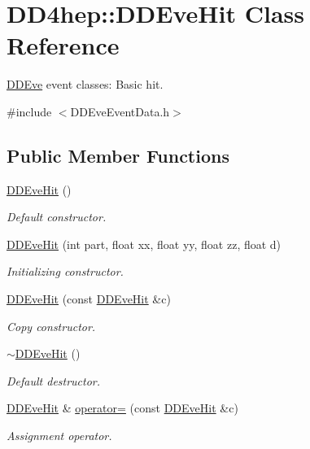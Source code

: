\hypertarget{class_d_d4hep_1_1_d_d_eve_hit}{}\section{D\+D4hep\+:\+:D\+D\+Eve\+Hit Class Reference}
\label{class_d_d4hep_1_1_d_d_eve_hit}


\hyperlink{struct_d_d4hep_1_1_d_d_eve}{D\+D\+Eve} event classes\+: Basic hit.  




{\ttfamily \#include $<$D\+D\+Eve\+Event\+Data.\+h$>$}

\subsection*{Public Member Functions}
\begin{DoxyCompactItemize}
\item 
\hyperlink{class_d_d4hep_1_1_d_d_eve_hit_a29f91ae5157d9d45c12b233b9a70cd98}{D\+D\+Eve\+Hit} ()
\begin{DoxyCompactList}\small\item\em Default constructor. \end{DoxyCompactList}\item 
\hyperlink{class_d_d4hep_1_1_d_d_eve_hit_aea1dc4022717ea0e59bb01add44a1892}{D\+D\+Eve\+Hit} (int part, float xx, float yy, float zz, float d)
\begin{DoxyCompactList}\small\item\em Initializing constructor. \end{DoxyCompactList}\item 
\hyperlink{class_d_d4hep_1_1_d_d_eve_hit_acbcc398eded594815f5f0258b7f8fbb1}{D\+D\+Eve\+Hit} (const \hyperlink{class_d_d4hep_1_1_d_d_eve_hit}{D\+D\+Eve\+Hit} \&c)
\begin{DoxyCompactList}\small\item\em Copy constructor. \end{DoxyCompactList}\item 
\hyperlink{class_d_d4hep_1_1_d_d_eve_hit_a2abe001ed0473c3cd00fe2137887935f}{$\sim$\+D\+D\+Eve\+Hit} ()
\begin{DoxyCompactList}\small\item\em Default destructor. \end{DoxyCompactList}\item 
\hyperlink{class_d_d4hep_1_1_d_d_eve_hit}{D\+D\+Eve\+Hit} \& \hyperlink{class_d_d4hep_1_1_d_d_eve_hit_ae8e64c5c76fe170a8ea6c4e3cf44f35d}{operator=} (const \hyperlink{class_d_d4hep_1_1_d_d_eve_hit}{D\+D\+Eve\+Hit} \&c)
\begin{DoxyCompactList}\small\item\em Assignment operator. \end{DoxyCompactList}\end{DoxyCompactItemize}
